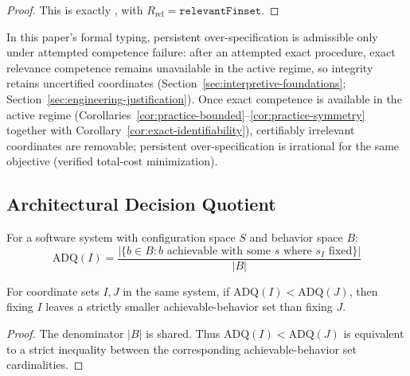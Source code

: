\begin{proof}
This is exactly
,
with $R_{\mathrm{rel}}=\texttt{relevantFinset}$.
\end{proof}

\begin{remark}\label{rem:overmodel-conditional}
In this paper's formal typing, persistent over-specification is admissible only under attempted competence failure: after an attempted exact procedure, exact relevance competence remains unavailable in the active regime, so integrity retains uncertified coordinates (Section~\ref{sec:interpretive-foundations}; Section~\ref{sec:engineering-justification}).
Once exact competence is available in the active regime (Corollaries~\ref{cor:practice-bounded}--\ref{cor:practice-symmetry} together with Corollary~\ref{cor:exact-identifiability}), certifiably irrelevant coordinates are removable; persistent over-specification is irrational for the same objective (verified total-cost minimization).
\end{remark}

\subsection{Architectural Decision Quotient}

\begin{definition}
For a software system with configuration space $S$ and behavior space $B$:
\[
\text{ADQ}(I) = \frac{|\{b \in B : b \text{ achievable with some } s \text{ where } s_I \text{ fixed}\}|}{|B|}
\]
\end{definition}

\begin{proposition}\label{prop:adq-ordering}
For coordinate sets $I,J$ in the same system, if $\mathrm{ADQ}(I) < \mathrm{ADQ}(J)$, then fixing $I$ leaves a strictly smaller achievable-behavior set than fixing $J$.
\end{proposition}

\begin{proof}
The denominator $|B|$ is shared. Thus $\mathrm{ADQ}(I) < \mathrm{ADQ}(J)$ is equivalent to a strict inequality between the corresponding achievable-behavior set cardinalities.
\end{proof}

